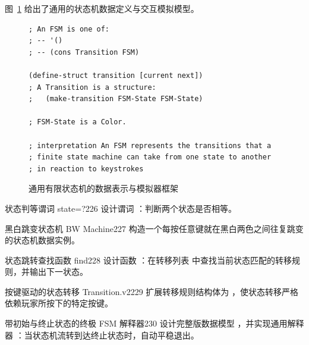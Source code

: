 图~\ref{fig:general_fsm} 给出了通用的状态机数据定义与交互模拟模型。

\begin{figure}[htbp]
  \centering
\begin{lstlisting}[language=BSL, basicstyle=\scriptsize\ttfamily]
; An FSM is one of:
; -- '()
; -- (cons Transition FSM)

(define-struct transition [current next])
; A Transition is a structure:
;   (make-transition FSM-State FSM-State)

; FSM-State is a Color.

; interpretation An FSM represents the transitions that a
; finite state machine can take from one state to another
; in reaction to keystrokes
\end{lstlisting}
  \caption{通用有限状态机的数据表示与模拟器框架}
  \label{fig:general_fsm}
\end{figure}

\begin{exercise}{状态判等谓词 state=?}{226}
设计谓词 ：判断两个状态是否相等。
\end{exercise}

\begin{exercise}{黑白跳变状态机 BW Machine}{227}
构造一个每按任意键就在黑白两色之间往复跳变的状态机数据实例。
\end{exercise}

\begin{exercise}{状态跳转查找函数 find}{228}
设计函数 ：在转移列表  中查找当前状态匹配的转移规则，并输出下一状态。
\end{exercise}

\begin{exercise}{按键驱动的状态转移 Transition.v2}{229}
扩展转移规则结构体为 ，使状态转移严格依赖玩家所按下的特定按键。
\end{exercise}

\begin{exercise}{带初始与终止状态的终极 FSM 解释器}{230}
设计完整版数据模型 ，并实现通用解释器 ：当状态机流转到达终止状态时，自动平稳退出。
\end{exercise}
